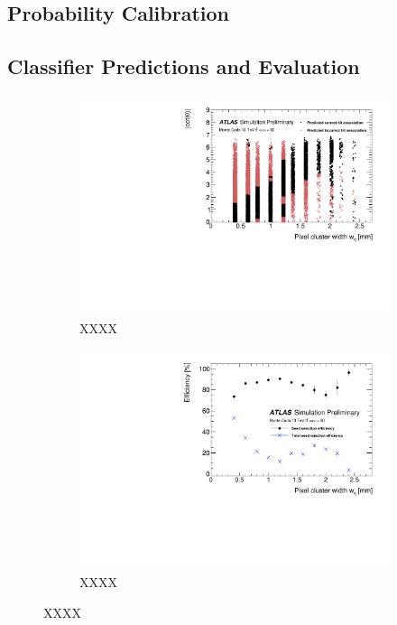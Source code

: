 \subsection{Probability Calibration}

\subsection{Classifier Predictions and Evaluation}

\begin{figure}[!htbp]
\centering
    \begin{subfigure}[a]{0.86\textwidth}
        \includegraphics[width=\linewidth]{images/4-ml-based-predictor/scatter_kde_predictions.pdf}
        \caption{XXXX}
    \end{subfigure}
    \hfill
    \begin{subfigure}[b]{0.86\textwidth}
        \centering
        \includegraphics[width=\linewidth]{images/4-ml-based-predictor/triplet_eff_metrics.pdf}
        \caption{XXXX}
    \end{subfigure}
\caption{XXXX}
\label{fig:predictions-pixel-barrel-and-triplet-efficiencies}
\end{figure}


